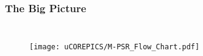 \documentclass{beamer}
\begin{document}
\begin{comment}
\begin{frame}
\frametitle{The Big Picture}

\tikzstyle{startstop} = [rectangle, rounded corners, minimum width=3cm, minimum height=1cm,text centered, draw=black, fill=green!30]

\tikzstyle{io} = [rectangle, rounded corners, minimum width=3cm, minimum height=1cm,text centered, draw=black, fill=green!30]

\tikzstyle{process} = [rectangle, minimum width=3cm, minimum height=1cm, text centered, draw=black, fill=red!30]

\tikzstyle{decision} = [rectangle, minimum width=3cm, minimum height=1cm, text centered, draw=black, fill=green!30]


\tikzstyle{arrow} = [thick,->,>=stealth]


\begin{tikzpicture}[node distance=2cm]

\node (in2) [startstop] {Partially Observable Environment};

\node (in1) [process, below of=in2] {Pick Operators};

\node (dec1) [decision, below of=in1, yshift=-0.5cm] {Learn PSR};

\node (io1) [io, left of=dec1, xshift = -2.5cm] {Query String };

\node (out1) [process, right of=dec1, xshift = 2.5cm] {Partition};
\node (stop) [startstop, below of=out1] {Probability};

\draw [arrow] (in1) -- node[anchor=east] {  \{$A_{a},A_{cb}$,...\} } (dec1);

\draw [arrow] (in2) -- node[anchor=east] {\{abcacb,bca,a,...\}} (in1);

\draw [arrow] (io1) -- node[anchor=south] {abcacb} (dec1);
\draw [arrow] (dec1) -- node[anchor=south] {a-bca-cb} (out1);
\draw [arrow] (out1) -- node[anchor=east] {$\alpha_0 \cdot A_a \cdot A_{bca} \cdot A_{cb} \cdot \alpha_{\infty}$} (stop);

\end{tikzpicture}
\end{frame}
\end{comment}


\begin{frame}
\frametitle{The Big Picture}

\begin{columns}[c]

\begin{figure}

\texttt{[image: uCOREPICS/M-PSR\_Flow\_Chart.pdf]}
\end{figure}
\end{columns}

\end{frame}
\end{document}
